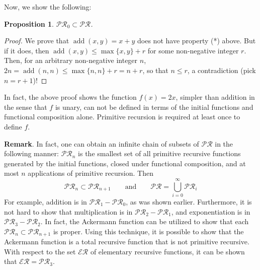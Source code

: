 \documentclass[12pt]{article}
\newtheorem{prop}{Proposition}
\begin{document}
Now, we show the following:
\begin{prop} $\mathcal{PR}_0 \subset \mathcal{PR}$. \end{prop}
\begin{proof} We prove that $\operatorname{add}(x,y)=x+y$ does not have property (*) above.  But if it does, then $\operatorname{add}(x,y)\le \max\lbrace x,y\rbrace + r$ for some non-negative integer $r$.  Then, for an arbitrary non-negative integer $n$, $2n=\operatorname{add}(n,n)\le \max\lbrace n,n\rbrace + r = n+r$, so that $n\le r$, a contradiction (pick $n=r+1$)!  \end{proof}

In fact, the above proof shows the function $f(x)=2x$, simpler than addition in the sense that $f$ is unary, can not be defined in terms of the initial functions and functional composition alone.  Primitive recursion is required at least once to define $f$.

\textbf{Remark}.  In fact, one can obtain an infinite chain of subsets of $\mathcal{PR}$ in the following manner: $\mathcal{PR}_n$ is the smallest set of all primitive recursive functions generated by the initial functions, closed under functional composition, and at most $n$ applications of primitive recursion.  Then
$$\mathcal{PR}_n \subset \mathcal{PR}_{n+1} \qquad \mbox{and} \qquad \mathcal{PR} = \bigcup_{i=0}^{\infty} \mathcal{PR}_i$$
For example, addition is in $\mathcal{PR}_1 - \mathcal{PR}_0$, as was shown earlier.  Furthermore, it is not hard to show that multiplication is in $\mathcal{PR}_2 - \mathcal{PR}_1$, and exponentiation is in $\mathcal{PR}_3 - \mathcal{PR}_2$.  In fact, the Ackermann function can be utilized to show that each $\mathcal{PR}_n \subset \mathcal{PR}_{n+1}$ is proper.  Using this technique, it is possible to show that the Ackermann function is a total recursive function that is not primitive recursive.  With respect to the set $\mathcal{ER}$ of elementary recursive functions, it can be shown that $\mathcal{ER}=\mathcal{PR}_3$.
\end{document}
